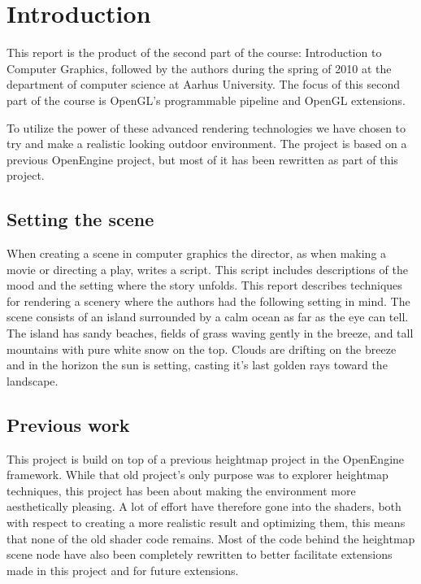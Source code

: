 
\chapter{Introduction}
This report is the product of the second part of the course:
Introduction to Computer Graphics, followed by the authors during the
spring of 2010 at the department of computer science at Aarhus
University. The focus of this second part of the course is OpenGL's
programmable pipeline and OpenGL extensions.

To utilize the power of these advanced rendering technologies we have
chosen to try and make a realistic looking outdoor environment. The
project is based on a previous OpenEngine project, but most of it has
been rewritten as part of this project.

\section{Setting the scene}
When creating a scene in computer graphics the director, as when
making a movie or directing a play, writes a script. This script
includes descriptions of the mood and the setting where the story
unfolds.
%
This report describes techniques for rendering a scenery 
where the authors had the following setting in mind.
%
The scene consists of an island surrounded by a calm ocean as far
as the eye can tell. The island has sandy beaches, fields of grass
waving gently in the breeze, and tall mountains with pure white snow
on the top. Clouds are drifting on the breeze and in the horizon
the sun is setting, casting it's last golden rays toward the
landscape.

\section{Previous work}
This project is build on top of a previous heightmap project in the
OpenEngine framework. While that old project's only purpose was to
explorer heightmap techniques, this project has been about making the
environment more aesthetically pleasing. A lot of effort have therefore
gone into the shaders, both with respect to creating a more realistic
result and optimizing them, this means that none of the old shader code
remains. Most of the code behind the heightmap scene node have also
been completely rewritten to better facilitate extensions made in this
project and for future extensions.

